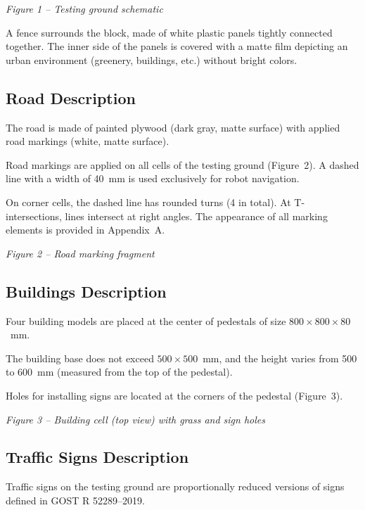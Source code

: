\documentclass[a4paper,12pt]{article}
\begin{document}
\begin{center}
\textit{Figure 1 -- Testing ground schematic}
\end{center}

A fence surrounds the block, made of white plastic panels tightly connected together. The inner side of the panels is covered with a matte film depicting an urban environment (greenery, buildings, etc.) without bright colors.

\subsection{Road Description}

The road is made of painted plywood (dark gray, matte surface) with applied road markings (white, matte surface).

Road markings are applied on all cells of the testing ground (Figure~2). A dashed line with a width of 40~mm is used exclusively for robot navigation.

On corner cells, the dashed line has rounded turns (4 in total). At T-intersections, lines intersect at right angles. The appearance of all marking elements is provided in Appendix~A.

\begin{center}
\textit{Figure 2 -- Road marking fragment}
\end{center}

\subsection{Buildings Description}

Four building models are placed at the center of pedestals of size $800 \times 800 \times 80$~mm.

The building base does not exceed $500 \times 500$~mm, and the height varies from 500 to 600~mm (measured from the top of the pedestal).

Holes for installing signs are located at the corners of the pedestal (Figure~3).

\begin{center}
\textit{Figure 3 -- Building cell (top view) with grass and sign holes}
\end{center}

\subsection{Traffic Signs Description}

Traffic signs on the testing ground are proportionally reduced versions of signs defined in GOST R 52289--2019.
\end{document}
